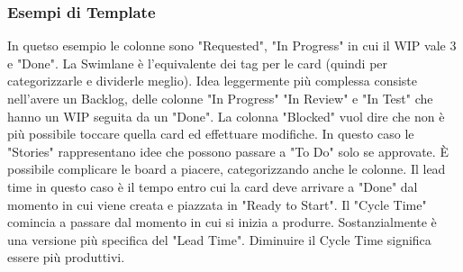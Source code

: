 \subsubsection{Esempi di Template}
In quetso esempio le colonne sono "Requested", "In Progress" in cui il WIP vale 3 e "Done". La Swimlane è l'equivalente dei tag per le card (quindi per categorizzarle e dividerle meglio).
\noindent Idea leggermente più complessa consiste nell'avere un Backlog, delle colonne "In Progress" "In Review" e "In Test" che hanno un WIP seguita da un "Done". La colonna "Blocked" vuol dire che non è più possibile toccare quella card ed effettuare modifiche.
\noindent In questo caso le "Stories" rappresentano idee che possono passare a "To Do" solo se approvate.
\noindent È possibile complicare le board a piacere, categorizzando anche le colonne.
\noindent Il lead time in questo caso è il tempo entro cui la card deve arrivare a "Done" dal momento in cui viene creata e piazzata in "Ready to Start".
\noindent Il "Cycle Time" comincia a passare dal momento in cui si inizia a produrre. Sostanzialmente è una versione più specifica del "Lead Time". Diminuire il Cycle Time significa essere più produttivi.

